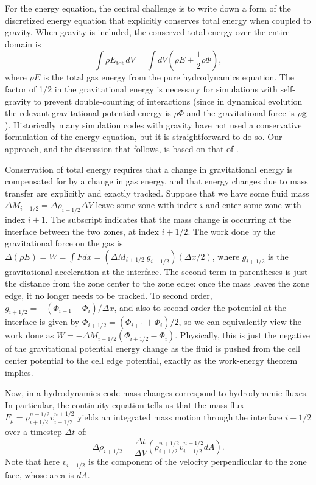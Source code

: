\documentclass[iop]{../emulateapj}
\begin{document}
For the energy equation, the central challenge is to write down a form of the 
discretized energy equation that explicitly conserves total energy when 
coupled to gravity. When gravity is included, the conserved total energy
over the entire domain is
\begin{equation}
  \int \rho E_{\text{tot}}\, dV = \int dV \left(\rho E + \frac{1}{2}\rho\Phi\right), \label{eq:total_energy_gravity}
\end{equation}
where $\rho E$ is the total gas energy from the pure hydrodynamics equation. 
The factor of 1/2 in the gravitational energy is necessary for simulations with
self-gravity to prevent double-counting of interactions (since in dynamical evolution
the relevant gravitational potential energy is $\rho \Phi$ and the gravitational force
is $\rho \mathbf{g}$). Historically many simulation codes with gravity have not used
a conservative formulation of the energy equation, but it is straightforward to do so.
Our approach, and the discussion that follows, is based on that of \cite{arepo}.

Conservation of total energy requires that a change in gravitational energy is compensated
for by a change in gas energy, and that energy changes due to mass transfer are explicitly and 
exactly tracked. Suppose that we have some fluid mass $\Delta M_{i+1/2} = \Delta \rho_{i+1/2} \Delta V$ leave some zone
with index $i$ and enter some zone with index $i+1$. The subscript indicates that the mass change is
occurring at the interface between the two zones, at index $i+1/2$. The work done by the gravitational
force on the gas is $\Delta (\rho E) = W = \int F dx = (\Delta M_{i+1/2}\ g_{i+1/2}) (\Delta x / 2)$,
where $g_{i+1/2}$ is the gravitational acceleration at the interface. The second term in parentheses
is just the distance from the zone center to the zone edge: once the mass leaves the zone edge, it no longer
needs to be tracked. To second order, $g_{i+1/2} = -(\Phi_{i+1} - \Phi_{i}) / \Delta x$, and also to second order the potential
at the interface is given by $\Phi_{i+1/2} = (\Phi_{i+1} + \Phi_i) / 2$, so we can equivalently view the work done
as $W = -\Delta M_{i+1/2} (\Phi_{i+1/2} - \Phi_i)$. Physically, this is just the negative of the gravitational
potential energy change as the fluid is pushed from the cell center potential to the cell edge potential,
exactly as the work-energy theorem implies. 

Now, in a hydrodynamics code mass changes correspond to hydrodynamic fluxes. In particular,
the continuity equation tells us that the mass flux $F_\rho = \rho^{n+1/2}_{i+1/2} v^{n+1/2}_{i+1/2}$ yields
an integrated mass motion through the interface $i+1/2$ over a timestep $\Delta t$ of:
\begin{equation}
  \Delta \rho_{i+1/2} = \frac{\Delta t}{\Delta V} \left(\rho^{n+1/2}_{i+1/2} v^{n+1/2}_{i+1/2} dA\right).
\end{equation}
Note that here $v_{i+1/2}$ is the component of the velocity perpendicular to the zone face, whose
area is $dA$.
\end{document}
